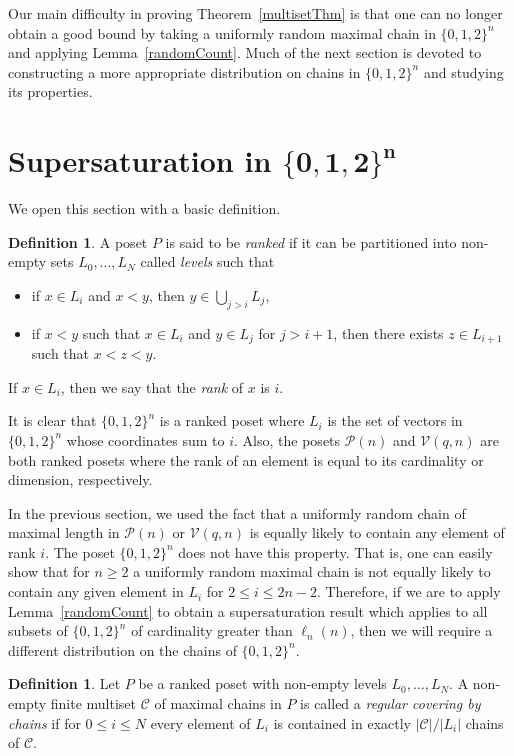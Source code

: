 \documentclass[11 pt]{article}
\theoremstyle{definition}
\newtheorem{defn}[equation]{Definition}
\theoremstyle{case}
\numberwithin{equation}{section}
\newcommand{\Vectors}[2]{\mathcal{V}\left(#1,#2\right)}
\begin{document}
Our main difficulty in proving Theorem~\ref{multisetThm} is that one can no longer obtain a good bound by taking a uniformly random maximal chain in $\{0,1,2\}^n$ and applying Lemma~\ref{randomCount}. Much of the next section is devoted to constructing a more appropriate distribution on chains in $\{0,1,2\}^n$ and studying its properties.

\section{Supersaturation in \texorpdfstring{$\boldsymbol{\{0,1,2\}^n}$}{\{0,1,2\}\textasciicircum n}}
\label{multisetSec}

We open this section with a basic definition.

\begin{defn}
A poset $P$ is said to be \emph{ranked} if it can be partitioned into non-empty sets $L_0,\dots,L_N$ called \emph{levels} such that 
\begin{itemize}
\item if $x\in L_i$ and $x<y$, then $y\in \bigcup_{j>i} L_j$,
\item if $x<y$ such that $x\in L_i$ and $y\in L_j$ for $j>i+1$, then there exists $z\in L_{i+1}$ such that $x<z<y$. 
\end{itemize}
If $x\in L_i$, then we say that the \emph{rank} of $x$ is $i$.
\end{defn}

It is clear that $\{0,1,2\}^n$ is a ranked poset where $L_i$ is the set of vectors in $\{0,1,2\}^n$ whose coordinates sum to $i$. Also, the posets $\mathcal{P}(n)$ and $\Vectors{q}{n}$ are both ranked posets where the rank of an element is equal to its cardinality or dimension, respectively.

In the previous section, we used the fact that a uniformly random chain of maximal length in $\mathcal{P}(n)$ or $\Vectors{q}{n}$ is equally likely to contain any element of rank $i$. The poset $\{0,1,2\}^n$ does not have this property. That is, one can easily show that for $n\geq2$ a uniformly random maximal chain is not equally likely to contain any given element in $L_i$ for $2\leq i\leq 2n-2$. Therefore, if we are to apply Lemma~\ref{randomCount} to obtain a supersaturation result which applies to all subsets of $\{0,1,2\}^n$ of cardinality greater than $\ell_n(n)$, then we will require a different distribution on the chains of $\{0,1,2\}^n$. 

\begin{defn}
Let $P$ be a ranked poset with non-empty levels $L_0,\dots,L_N$. A non-empty finite multiset $\mathscr{C}$ of maximal chains in $P$ is called a \emph{regular covering by chains} if for  $0\leq i\leq N$ every element of $L_i$ is contained in exactly $|\mathscr{C}|/|L_i|$ chains of $\mathscr{C}$. 
\end{defn}
\end{document}
